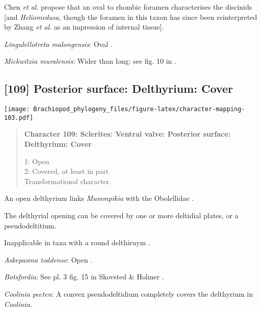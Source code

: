 \documentclass[openany]{book}
\theoremstyle{definition}
\theoremstyle{definition}
\theoremstyle{definition}
\theoremstyle{remark}
\begin{document}
Chen \emph{et al}. \citeyearpar{Chen2007Reinterpretationof} propose that
an oval to rhombic foramen characterises the discinids {[}and
\emph{Heliomedusa}, though the foramen in this taxon has since been
reinterpreted by Zhang \emph{et al}.
\citeyearpar{Zhang2009Architectureand} as an impression of internal
tissue{]}.

\hypertarget{Lingulellotreta_malongensis-coding-108}{}
\emph{Lingulellotreta malongensis}: Oval
\citep{Williams2000LinguliformeaCraniiformea}.

\hypertarget{Mickwitzia_muralensis-coding-108}{}
\emph{Mickwitzia muralensis}: Wider than long: see fig. 10 in
\citet{Balthasar2004Shellstructure}.

\subsection*{{[}109{]} Posterior surface: Delthyrium:
Cover}\label{posterior-surface-delthyrium-cover}

\texttt{[image: Brachiopod\_phylogeny\_files/figure-latex/character-mapping-103.pdf]}

\begin{quote}
\textbf{Character 109: Sclerites: Ventral valve: Posterior surface:
Delthyrium: Cover}

1: Open\\
2: Covered, at least in part\\
Transformational character.
\end{quote}

An open delthyrium links \emph{Mummpikia} with the Obolellidae
\citep{Balthasar2008iMummpikia}.

The delthyrial opening can be covered by one or more deltidial plates,
or a pseudodeltitium.

Inapplicable in taxa with a round delthiruym \citep[generated by
overgrowth of the delthyrial opening by posterolateral parts of the
shell, per][]{Popov1992TheCambrian}.

\hypertarget{Askepasma_toddense-coding-109}{}
\emph{Askepasma toddense}: Open \citep{Topper2013Theoldest}.

\hypertarget{Botsfordia-coding-109}{}
\emph{Botsfordia}: See pl. 3 fig. 15 in Skovsted \& Holmer
\citeyearpar{Skovsted2005EarlyCambrian}.

\hypertarget{Coolinia_pecten-coding-109}{}
\emph{Coolinia pecten}: A convex pseudodeltidium completely covers the
delthyrium in \emph{Coolinia}.
\end{document}
